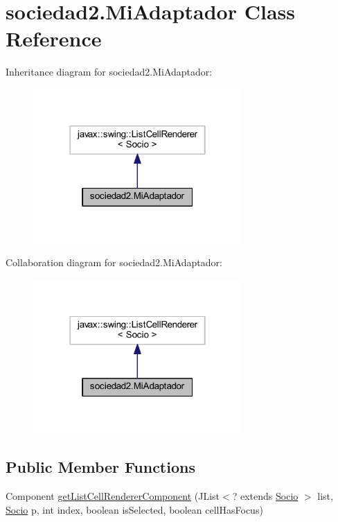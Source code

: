 \hypertarget{classsociedad2_1_1_mi_adaptador}{}\section{sociedad2.\+Mi\+Adaptador Class Reference}
\label{classsociedad2_1_1_mi_adaptador}


Inheritance diagram for sociedad2.\+Mi\+Adaptador\+:
\nopagebreak
\begin{figure}[H]
\begin{center}
\leavevmode
\includegraphics[width=226pt]{classsociedad2_1_1_mi_adaptador__inherit__graph}
\end{center}
\end{figure}


Collaboration diagram for sociedad2.\+Mi\+Adaptador\+:
\nopagebreak
\begin{figure}[H]
\begin{center}
\leavevmode
\includegraphics[width=226pt]{classsociedad2_1_1_mi_adaptador__coll__graph}
\end{center}
\end{figure}
\subsection*{Public Member Functions}
\begin{DoxyCompactItemize}
\item 
Component \mbox{\hyperlink{classsociedad2_1_1_mi_adaptador_a27def0784983d566dabf88f07bbdd913}{get\+List\+Cell\+Renderer\+Component}} (J\+List$<$? extends \mbox{\hyperlink{classsociedad2_1_1_socio}{Socio}} $>$ list, \mbox{\hyperlink{classsociedad2_1_1_socio}{Socio}} p, int index, boolean is\+Selected, boolean cell\+Has\+Focus)
\end{DoxyCompactItemize}


